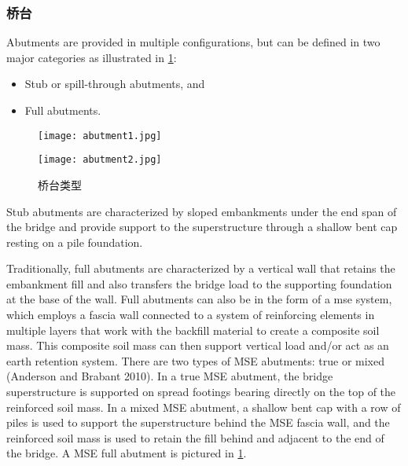 \subsubsection{桥台}
Abutments are provided in multiple configurations, but can be defined in two major categories as illustrated in \cref{fig:abutmenttypes}:
\begin{itemize}
  \item Stub or spill-through abutments, and
  \item Full abutments.
\end{itemize}

\begin{figure}
  \begin{minipage}{0.48\linewidth}\centering
    \texttt{[image: abutment1.jpg]}
  \end{minipage}\hfil
  \begin{minipage}{0.48\linewidth}\centering
    \texttt{[image: abutment2.jpg]}
  \end{minipage}
  \caption{桥台类型}
  \label{fig:abutmenttypes}
\end{figure}

Stub abutments are characterized by sloped embankments under the end span of the bridge and provide support to the superstructure through a shallow bent cap resting on a pile foundation.

Traditionally, full abutments are characterized by a vertical wall that retains the embankment fill and also transfers the bridge load to the supporting foundation at the base of the wall. Full abutments can also be in the form of a \acrfull{mse} system, which employs a fascia wall connected to a system of reinforcing elements in multiple layers that work with the backfill material to create a composite soil mass. This composite soil mass can then support vertical load and/or act as an earth retention system. There are two types of MSE abutments: true or mixed (Anderson and Brabant 2010). In a true MSE abutment, the bridge superstructure is supported on spread footings bearing directly on the top of the reinforced soil mass. In a mixed MSE abutment, a shallow bent cap with a row of piles is used to support the superstructure behind the MSE fascia wall, and the reinforced soil mass is used to retain the fill behind and adjacent to the end of the bridge. A MSE full abutment is pictured in \cref{fig:abutmenttypes}.

